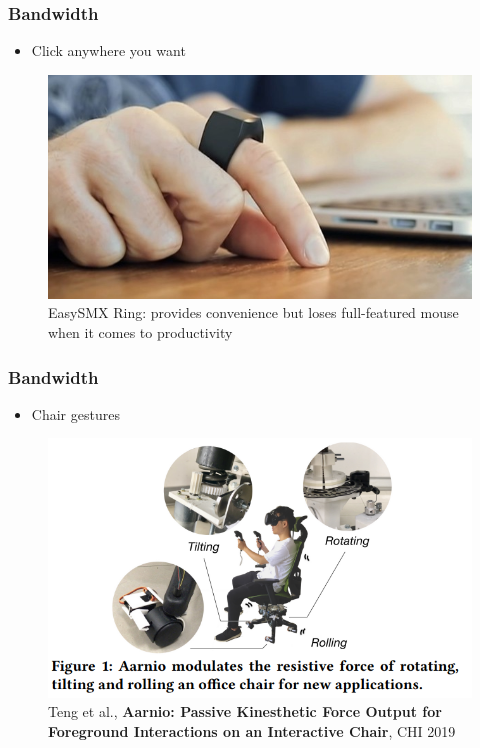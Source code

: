 \documentclass{beamer}
\begin{document}

\begin{frame}
	\frametitle{Bandwidth}
	\begin{itemize}
		\item Click anywhere you want
	\end{itemize}
	\begin{figure}
		\includegraphics[width=0.7\linewidth]{image/ringmouse}
		\caption{EasySMX Ring: provides convenience but loses full-featured mouse when it comes to productivity}
	\end{figure}
\end{frame}

\begin{frame}
	\frametitle{Bandwidth}
	\begin{itemize}
		\item Chair gestures
	\end{itemize}
	\begin{figure}
		\includegraphics[width=0.7\linewidth]{image/chairgestures}
		\caption{Teng et al., \textbf{Aarnio: Passive Kinesthetic Force Output for Foreground Interactions on an Interactive Chair}, CHI 2019}
	\end{figure}
\end{frame}
\end{document}
